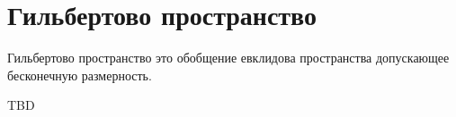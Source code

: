 \section{Гильбертово пространство}

Гильбертово пространство это обобщение евклидова пространства
допускающее бесконечную размерность.

\begin{definition}
TBD
\end{definition}



